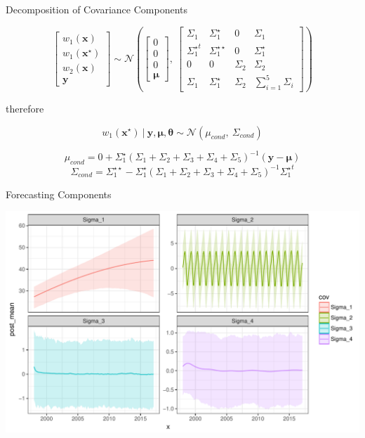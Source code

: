 \documentclass[11pt,ignorenonframetext,]{beamer}
\begin{document}
\begin{frame}[t]{Decomposition of Covariance Components}

\footnotesize
\[ \begin{bmatrix} 
w_1(\bm{x}) \\
w_1(\bm{x}^\star) \\
w_2(\bm{x}) \\
\bm{y}
\end{bmatrix} 
\sim \mathcal{N} \left(
\begin{bmatrix}
0 \\ 0\\ 0\\ \bm{\mu}
\end{bmatrix},~
\begin{bmatrix}
\Sigma_1 & \Sigma_1^\star & 0 & \Sigma_1 \\
{\Sigma_1^\star}^t & \Sigma_1^{\star\star} & 0 & \Sigma_1^\star \\
0 & 0 & \Sigma_2 & \Sigma_2 \\
\Sigma_1 & \Sigma_1^\star & \Sigma_2 & \sum_{i=1}^5 \Sigma_i
\end{bmatrix}
\right)
\]

\normalsize

therefore

\[ w_1(\bm{x}^\star) ~|~ \bm{y},\bm\mu,\bm\theta \sim \mathcal{N}(\mu_{cond},~ \Sigma_{cond}) \]

\[ \mu_{cond} = 0 + \Sigma_1^\star (\Sigma_1 + \Sigma_2 + \Sigma_3 + \Sigma_4 + \Sigma_5)^{-1}(\bm{y}-\bm\mu) \]
\[ \Sigma_{cond} = \Sigma_1^{\star\star} - \Sigma_1^\star (\Sigma_1 + \Sigma_2 + \Sigma_3 + \Sigma_4 + \Sigma_5)^{-1} {\Sigma_1^\star}^t \]

\end{frame}

\begin{frame}{Forecasting Components}

\includegraphics{Lec15_files/figure-beamer/unnamed-chunk-20-1.pdf}

\end{frame}
\end{document}
